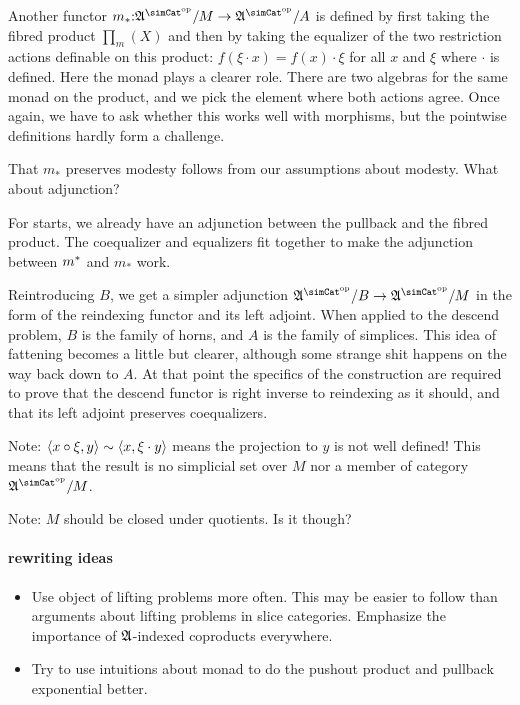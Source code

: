 \documentclass[csh.tex]{subfiles}
\begin{document}
Another functor $m_*\of\ambient\s/M\to \ambient\s/A$ is defined by first taking the fibred product $\prod_m(X)$ and then by taking the equalizer of the two restriction actions definable on this product: $f(\xi\cdot x) = f(x)\cdot \xi$ for all $x$ and $\xi$ where $\cdot$ is defined. Here the monad plays a clearer role. There are two algebras for the same monad on the product, and we pick the element where both actions agree.
Once again, we have to ask whether this works well with morphisms, but the pointwise definitions hardly form a challenge.

That $m_*$ preserves modesty follows from our assumptions about modesty. What about adjunction?

For starts, we already have an adjunction between the pullback and the fibred product. The coequalizer and equalizers fit together to make the adjunction between $m^*$ and $m_*$ work.

Reintroducing $B$, we get a simpler adjunction $\ambient\s/B\to \ambient\s/M$ in the form of the reindexing functor and its left adjoint. When applied to the descend problem, $B$ is the family of horns, and $A$ is the family of simplices. This idea of fattening becomes a little but clearer, although some strange shit happens on the way back down to $A$. At that point the specifics of the construction are required to prove that the descend functor is right inverse to reindexing as it should, and that its left adjoint preserves coequalizers.

Note: $\left\langle x\circ \xi , y \right\rangle\sim\left\langle x,\xi\cdot y \right\rangle$ means the projection to $y$ is not well defined! This means that the result is no simplicial set over $M$ nor a member of category $\ambient\s/M$.

Note: $M$ should be closed under quotients. Is it though?


\paragraph{rewriting ideas}
\begin{itemize}
\item Use object of lifting problems more often. This may be easier to follow than arguments about lifting problems in slice categories. Emphasize the importance of $\mathfrak A$-indexed coproducts everywhere.
\item Try to use intuitions about monad to do the pushout product and pullback exponential better.
\end{itemize}
\end{document}
